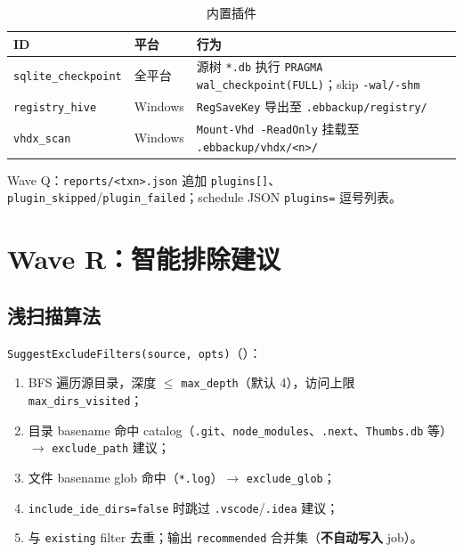 \begin{longtable}{@{}llp{7.5cm}@{}}
\caption{内置插件} \\
\toprule
ID & 平台 & 行为 \\
\midrule
\texttt{sqlite\_checkpoint} & 全平台 & 源树 \texttt{*.db} 执行 \texttt{PRAGMA wal\_checkpoint(FULL)}；skip \texttt{-wal/-shm} \\
\texttt{registry\_hive} & Windows & \texttt{RegSaveKey} 导出至 \texttt{.ebbackup/registry/} \\
\texttt{vhdx\_scan} & Windows & \texttt{Mount-Vhd -ReadOnly} 挂载至 \texttt{.ebbackup/vhdx/<n>/} \\
\bottomrule
\end{longtable}

Wave Q：\texttt{reports/<txn>.json} 追加 \texttt{plugins[]}、\texttt{plugin\_skipped}/\texttt{plugin\_failed}；schedule JSON \texttt{plugins=} 逗号列表。

\section{Wave R：智能排除建议}
\label{sec:cap-exclude}

\subsection{浅扫描算法}

\texttt{SuggestExcludeFilters(source, opts)}（）：
\begin{enumerate}[nosep]
  \item BFS 遍历源目录，深度 $\leq$ \texttt{max\_depth}（默认 4），访问上限 \texttt{max\_dirs\_visited}；
  \item 目录 basename 命中 catalog（\texttt{.git}、\texttt{node\_modules}、\texttt{.next}、\texttt{Thumbs.db} 等）$\rightarrow$ \texttt{exclude\_path} 建议；
  \item 文件 basename glob 命中（\texttt{*.log}）$\rightarrow$ \texttt{exclude\_glob}；
  \item \texttt{include\_ide\_dirs=false} 时跳过 \texttt{.vscode}/\texttt{.idea} 建议；
  \item 与 \texttt{existing} filter 去重；输出 \texttt{recommended} 合并集（\textbf{不自动写入} job）。
\end{enumerate}

